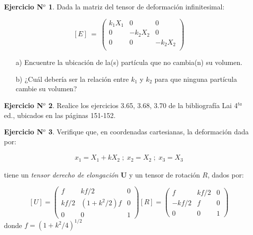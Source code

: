 \documentclass[11pt,a4paper]{article}
\theoremstyle{definition}
\newtheorem{theorem}{Ejercicio N$^o$}
\begin{document}
\medskip

\begin{theorem}
Dada la matriz del tensor de deformación infinitesimal:

\[
[E] \: = \: \left( \begin{array}{ccc}

k_1 X_1 & 0 & 0 \\
0 & -k_2 X_2 & 0 \\
0 & 0 & -k_2 X_2 \\

\end{array} \right)  
\] 

\begin{itemize}
\item[a)] Encuentre la ubicación de la(s) partícula que no cambia(n) su volumen.
\item[b)] ¿Cuál debería ser la relación entre $k_1$ y $k_2$ para que ninguna partícula cambie su volumen?
\end{itemize}
\end{theorem}


\medskip


\begin{theorem}
Realice los ejercicios 3.65, 3.68, 3.70 de la bibliografía Lai 4$^{ta}$ ed., ubicados en las páginas 151-152.
\end{theorem}

\medskip



\begin{theorem}
Verifique que, en coordenadas cartesianas, la deformación dada por:

\begin{align} \nonumber
x_1 = X_1 + kX_2 \; ; \; x_2 = X_2 \; ; \; x_3 = X_3
\end{align}

tiene un \textit{tensor derecho de elongación} $\mathbf{U}$ y un tensor de rotación $R$, dados por:


\begin{equation} \nonumber
[U] = \begin{pmatrix}
 f       &       kf/2     &  0\\
  kf/2 & (1+k^2/2)f &  0\\
   0    &         0       & 1
\end{pmatrix}
[R] = \begin{pmatrix} f & kf/2 & 0\\- kf/2 & f &  0\\ 0  & 0  & 1  \end{pmatrix}
\end{equation}
\noindent donde $f = (1+k^2/4)^{1/2}$
\end{theorem}
\end{document}
